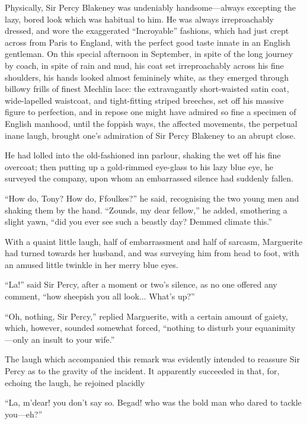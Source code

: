 Physically, Sir Percy Blakeney was undeniably  handsome---always excepting the lazy, bored look which was habitual to him. He was always irreproachably dressed, and wore the exaggerated \enquote{Incroyable} fashions, which had just crept across from Paris to England, with the perfect good taste innate in an English gentleman. On this special afternoon in September, in spite of the long journey by coach, in spite of rain and mud, his coat set irreproachably across his fine shoulders, his hands looked almost femininely white, as they emerged through billowy frills of finest Mechlin lace: the extravagantly short-waisted satin coat, wide-lapelled waistcoat, and tight-fitting striped breeches, set off his massive figure to perfection, and in repose one might have admired so fine a specimen of English manhood, until the foppish ways, the affected movements, the perpetual inane laugh, brought one's admiration of Sir Percy Blakeney to an abrupt close.

He had lolled into the old-fashioned inn parlour, shaking the wet off his fine overcoat; then putting up a gold-rimmed eye-glass to his lazy blue eye, he surveyed the company, upon whom an embarrassed silence had suddenly fallen.

\enquote{How do, Tony? How do, Ffoulkes?} he said, recognising the two young men and shaking them by the hand. \enquote{Zounds, my dear fellow,} he added, smothering a slight yawn, \enquote{did you ever see such a beastly day? Demmed climate this.}

With a quaint little laugh, half of embarrassment and half of sarcasm, Marguerite had turned towards her husband, and was surveying him from head to foot, with an amused little twinkle in her merry blue eyes.

\enquote{La!} said Sir Percy, after a moment or two's silence, as no one offered any comment, \enquote{how sheepish you all look... What's up?}

\enquote{Oh, nothing, Sir Percy,} replied Marguerite, with a certain amount of gaiety, which, however, sounded somewhat forced, \enquote{nothing to disturb your equanimity---only an insult to your wife.}

The laugh which accompanied this remark was evidently intended to reassure Sir Percy as to the gravity of the incident. It apparently succeeded in that, for, echoing the laugh, he rejoined placidly\longdash


\enquote{La, m'dear! you don't say so. Begad! who was the bold man who dared to tackle you---eh?}

